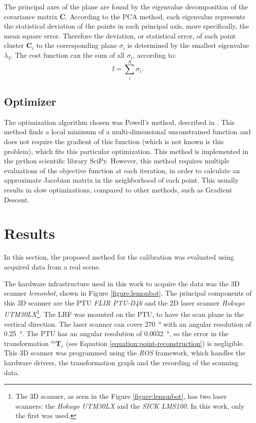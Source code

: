 \documentclass[conference]{IEEEtran}
\begin{document}
The principal axes of the plane are found by the eigenvalue decomposition of the covariance matrix $\bm{C}$. According to the PCA method, each eigenvalue represents the statistical deviation of the points in each principal axis, more specifically, the mean square error. Therefore the deviation, or statistical error, of each point cluster $\bm{C}_i$ to the corresponding plane $\sigma_i$ is determined by the smallest eigenvalue $\lambda_3$. The cost function can the sum of all $\sigma_i$, according to:
%
\begin{equation}
    \textrm{f} = \sum_{i}^{N}{\sigma_i}.
\end{equation}

\subsection{Optimizer}

The optimization algorithm chosen was Powell's method, described in \cite{powell64}. This method finds a local minimum of a multi-dimensional unconstrained function and does not require the gradient of this function (which is not known is this problem), which fits this particular optimization. This method is implemented in the python scientific library SciPy. However, this method requires multiple evaluations of the objective function at each iteration, in order to calculate an approximate Jacobian matrix in the neighborhood of each point. This usually results in slow optimizations, compared to other methods, such as Gradient Descent.

\section{Results}
\label{section:results}

In this section, the proposed method for the calibration was evaluated using acquired data from a real scene. 

The hardware infrastructure used in this work to acquire the data was the 3D scanner \textit{lemonbot}, shown in Figure \ref{figure:lemonbot}. The principal components of this 3D scanner are the PTU \textit{FLIR PTU-D46} and the 2D laser scanner \textit{Hokuyo UTM30LX}\footnote{The 3D scanner, as seen in the Figure \ref{figure:lemonbot}, has two laser scanners: the \textit{Hokuyo UTM30LX} and the \textit{SICK LMS100}. In this work, only the first was used.}. The LRF was mounted on the PTU, to have the scan plane in the vertical direction. The laser scanner can cover \SI{270}{\degree} with an angular resolution of \SI{0.25}{\degree}. The PTU has an angular resolution of \SI{0.0032}{\degree}, so the error in the transformation $^{m}\mathbf{T}_{e}$ (see Equation \ref{equation:point-reconstruction}) is negligible. This 3D scanner was programmed using the \textit{ROS} framework, which handles the hardware drivers, the transformation graph and the recording of the scanning data.
\end{document}
